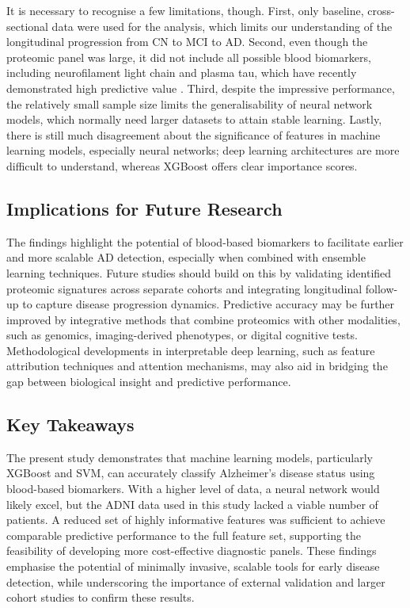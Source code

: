 \documentclass[a4paper,12pt]{article}
\begin{document}
It is necessary to recognise a few limitations, though.  First, only baseline, cross-sectional data were used for the analysis, which limits our understanding of the longitudinal progression from CN to MCI to AD.  Second, even though the proteomic panel was large, it did not include all possible blood biomarkers, including neurofilament light chain and plasma tau, which have recently demonstrated high predictive value \cite{karikari2020blood}.  Third, despite the impressive performance, the relatively small sample size limits the generalisability of neural network models, which normally need larger datasets to attain stable learning.  Lastly, there is still much disagreement about the significance of features in machine learning models, especially neural networks; deep learning architectures are more difficult to understand, whereas XGBoost offers clear importance scores.

\subsection{Implications for Future Research}
The findings highlight the potential of blood-based biomarkers to facilitate earlier and more scalable AD detection, especially when combined with ensemble learning techniques.  Future studies should build on this by validating identified proteomic signatures across separate cohorts and integrating longitudinal follow-up to capture disease progression dynamics.  Predictive accuracy may be further improved by integrative methods that combine proteomics with other modalities, such as genomics, imaging-derived phenotypes, or digital cognitive tests.  Methodological developments in interpretable deep learning, such as feature attribution techniques and attention mechanisms, may also aid in bridging the gap between biological insight and predictive performance. 

\subsection{Key Takeaways}
The present study demonstrates that machine learning models, particularly XGBoost and SVM, can accurately classify Alzheimer’s disease status using blood-based biomarkers. With a higher level of data, a neural network would likely excel, but the ADNI data used in this study lacked a viable number of patients. A reduced set of highly informative features was sufficient to achieve comparable predictive performance to the full feature set, supporting the feasibility of developing more cost-effective diagnostic panels. These findings emphasise the potential of minimally invasive, scalable tools for early disease detection, while underscoring the importance of external validation and larger cohort studies to confirm these results.
\end{document}
